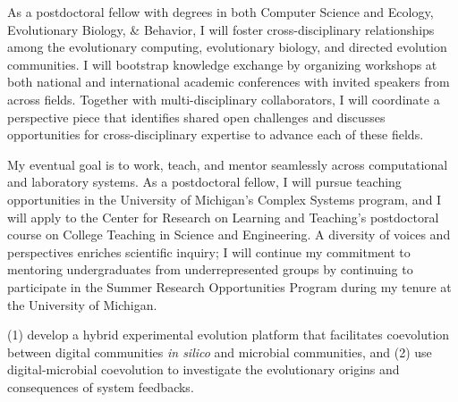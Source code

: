 
As a postdoctoral fellow with degrees in both Computer Science and Ecology, Evolutionary Biology, \& Behavior, I will foster cross-disciplinary relationships among the evolutionary computing, evolutionary biology, and directed evolution communities. 
I will bootstrap knowledge exchange by organizing workshops at both national and international academic conferences with invited speakers from across fields. 
Together with multi-disciplinary collaborators, I will coordinate a perspective piece that identifies shared open challenges and discusses opportunities for cross-disciplinary expertise to advance each of these fields. 

My eventual goal is to work, teach, and mentor seamlessly across computational and laboratory systems.
As a postdoctoral fellow, I will pursue teaching opportunities in the University of Michigan's Complex Systems program, and I will apply to the Center for Research on Learning and Teaching's postdoctoral course on College Teaching in Science and Engineering.
A diversity of voices and perspectives enriches scientific inquiry; I will continue my commitment to mentoring undergraduates from underrepresented groups by continuing to participate in the Summer Research Opportunities Program during my tenure at the University of Michigan.


(1) develop a hybrid experimental evolution platform that facilitates coevolution between digital communities \textit{in silico} and microbial communities, 
and (2) use digital-microbial coevolution to investigate the evolutionary origins and consequences of system feedbacks.